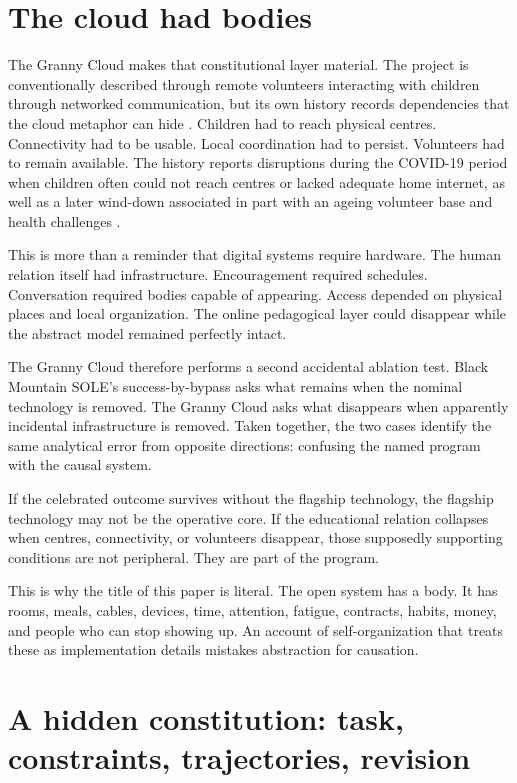 \documentclass[11pt]{article}
\begin{document}
\section{The cloud had bodies}

The Granny Cloud makes that constitutional layer material. The project is conventionally described through remote volunteers interacting with children through networked communication, but its own history records dependencies that the cloud metaphor can hide \cite{grannycloud_background}. Children had to reach physical centres. Connectivity had to be usable. Local coordination had to persist. Volunteers had to remain available. The history reports disruptions during the COVID-19 period when children often could not reach centres or lacked adequate home internet, as well as a later wind-down associated in part with an ageing volunteer base and health challenges \cite{grannycloud_background}.

This is more than a reminder that digital systems require hardware. The human relation itself had infrastructure. Encouragement required schedules. Conversation required bodies capable of appearing. Access depended on physical places and local organization. The online pedagogical layer could disappear while the abstract model remained perfectly intact.

The Granny Cloud therefore performs a second accidental ablation test. Black Mountain SOLE's success-by-bypass asks what remains when the nominal technology is removed. The Granny Cloud asks what disappears when apparently incidental infrastructure is removed. Taken together, the two cases identify the same analytical error from opposite directions: confusing the named program with the causal system.

If the celebrated outcome survives without the flagship technology, the flagship technology may not be the operative core. If the educational relation collapses when centres, connectivity, or volunteers disappear, those supposedly supporting conditions are not peripheral. They are part of the program.

This is why the title of this paper is literal. The open system has a body. It has rooms, meals, cables, devices, time, attention, fatigue, contracts, habits, money, and people who can stop showing up. An account of self-organization that treats these as implementation details mistakes abstraction for causation.

\section{A hidden constitution: task, constraints, trajectories, revision}
\end{document}
